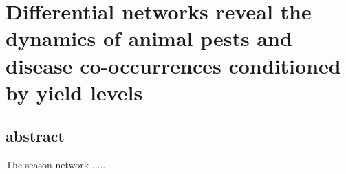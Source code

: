 \section{Differential networks reveal the dynamics of animal pests and disease co-occurrences conditioned by yield levels}


\subsection{abstract}
The season network ..... 
